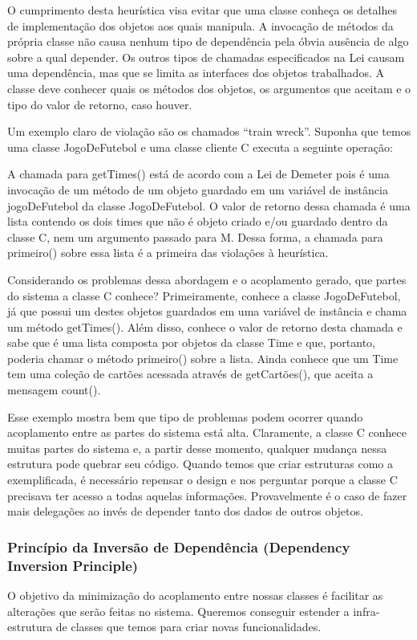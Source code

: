 O cumprimento desta heurística visa evitar que uma classe conheça os detalhes de implementação dos objetos aos quais manipula. A invocação de métodos da própria classe não causa nenhum tipo de dependência pela óbvia ausência de algo sobre a qual depender. Os outros tipos de chamadas especificados na Lei causam uma dependência, mas que se limita as interfaces dos objetos trabalhados. A classe deve conhecer quais os métodos dos objetos, os argumentos que aceitam e o tipo do valor de retorno, caso houver.
	
Um exemplo claro de violação são os chamados ``train wreck''. Suponha que temos uma classe JogoDeFutebol e uma classe cliente C executa a seguinte operação:
	


A chamada para getTimes() está de acordo com a Lei de Demeter pois é uma invocação de um método de um objeto guardado em um variável de instância jogoDeFutebol da classe JogoDeFutebol. O valor de retorno dessa chamada é uma lista contendo os dois times que não é objeto criado e/ou guardado dentro da classe C, nem um argumento passado para M. Dessa forma, a chamada para primeiro() sobre essa lista é a primeira das violações à heurística.
	
Considerando os problemas dessa abordagem e o acoplamento gerado, que partes do sistema a classe C conhece? Primeiramente, conhece a classe JogoDeFutebol, já que possui um destes objetos guardados em uma variável de instância e chama um método getTimes(). Além disso, conhece o valor de retorno desta chamada e sabe que é uma lista composta por objetos da classe Time e que, portanto, poderia chamar o método primeiro() sobre a lista. Ainda conhece que um Time tem uma coleção de cartões acessada através de getCartões(), que aceita a mensagem count().
	
Esse exemplo mostra bem que tipo de problemas podem ocorrer quando acoplamento entre as partes do sistema está alta. Claramente, a classe C conhece muitas partes do sistema e, a partir desse momento, qualquer mudança nessa estrutura pode quebrar seu código. Quando temos que criar estruturas como a exemplificada, é necessário repensar o design e nos perguntar porque a classe C precisava ter acesso a todas aquelas informações. Provavelmente é o caso de fazer mais delegações ao invés de depender tanto dos dados de outros objetos.

\subsubsection{Princípio da Inversão de Dependência (Dependency Inversion Principle)}
O objetivo da minimização do acoplamento entre nossas classes é facilitar as alterações que serão feitas no sistema. Queremos conseguir estender a infra-estrutura de classes que temos para criar novas funcionalidades.
	

